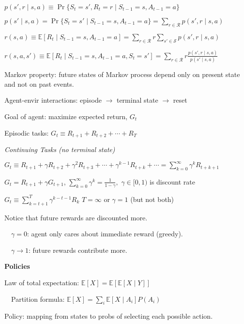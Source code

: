 \documentclass[twocolumn]{article}
\begin{document}
$p(s', r \mid s,a) \equiv \Pr \{ S_t = s', R_t = r \mid S_{t-1} = s, A_{t-1} = a \}$

$p(s' \mid s, a) = \Pr \{ S_t = s' \mid S_{t-1} = s, A_{t-1} = a \} = \sum_{r \in \mathcal R} p(s', r \mid s, a)$

$r(s, a) \equiv \mathbb E [R_t \mid S_{t-1} = s, A_{t-1} = a] = \sum_{r \in \mathcal R} r \sum_{s' \in \mathcal S} p(s', r \mid s, a)$

$r(s, a, s') \equiv \mathbb E [R_t \mid S_{t-1} = s, A_{t-1} = a, S_t = s'] = \sum_{r \in \mathcal R} r \frac{p(s', r \mid s, a)}{p(s' \mid s, a)}$

\dotfill

Markov property: future states of Markov process depend only on present state and not on past events.

Agent-envir interactions: episode $\to$ terminal state $\to$ reset

Goal of agent: maximize expected return, $G_t$

Episodic tasks: $G_t \equiv R_{t+1} + R_{t+2} + \cdots + R_T$

\vspace{-.5em}
\dotfill

\textit{Continuing Tasks (no terminal state)}

$G_t \equiv R_{t+1} + \gamma R_{t+2} + \gamma^2 R_{t+3} + \cdots + \gamma^{k-1} R_{t+k} + \cdots = \sum_{k=0}^\infty \gamma^k R_{t+k+1}$

$G_t = R_{t+1} + \gamma G_{t+1}$, \hfill $\sum_{k=0}^\infty \gamma^k = \frac{1}{1-\gamma},$ \hfill $\gamma \in [0, 1)$ is discount rate

$G_t \equiv \sum_{k=t+1}^T \gamma^{k-t-1} R_k$ \hfill $T = \infty$ or $\gamma = 1$ (but not both)

Notice that future rewards are discounted more.

$\quad \gamma = 0$: agent only cares about immediate reward (greedy).

$\quad \gamma \to 1$: future rewards contribute more.

\vspace{-.5em}
\dotfill

\textbf{Policies}

Law of total expectation: $\mathbb E[X] = \mathbb E[\mathbb E[X \mid Y]]$

$\quad$Partition formula: $\mathbb E[X] = \sum_i \mathbb E[X \mid A_i] P(A_i)$

Policy: mapping from states to probs of selecting each possible action.
\end{document}

